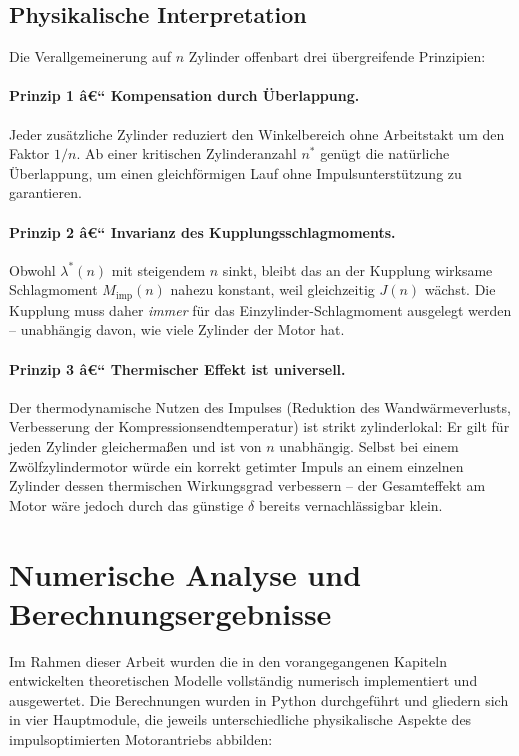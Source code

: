 ﻿\documentclass[a4paper,12pt]{article}
\begin{document}
\subsection{Physikalische Interpretation}

Die Verallgemeinerung auf $n$ Zylinder offenbart drei übergreifende Prinzipien:

\paragraph{Prinzip 1 â€“ Kompensation durch Überlappung.}
Jeder zusätzliche Zylinder reduziert den Winkelbereich ohne Arbeitstakt
um den Faktor $1/n$. Ab einer kritischen Zylinderanzahl $n^*$ genügt die
natürliche Überlappung, um einen gleichförmigen Lauf ohne Impulsunterstützung
zu garantieren.

\paragraph{Prinzip 2 â€“ Invarianz des Kupplungsschlagmoments.}
Obwohl $\lambda^*(n)$ mit steigendem $n$ sinkt, bleibt das an der
Kupplung wirksame Schlagmoment $M_\text{imp}(n)$ nahezu konstant, weil
gleichzeitig $J(n)$ wächst. Die Kupplung muss daher \textit{immer}
für das Einzylinder-Schlagmoment ausgelegt werden -- unabhängig davon,
wie viele Zylinder der Motor hat.

\paragraph{Prinzip 3 â€“ Thermischer Effekt ist universell.}
Der thermodynamische Nutzen des Impulses (Reduktion des Wandwärmeverlusts,
Verbesserung der Kompressionsendtemperatur) ist strikt zylinderlokal:
Er gilt für jeden Zylinder gleichermaßen und ist von $n$ unabhängig.
Selbst bei einem Zwölfzylindermotor würde ein korrekt getimter Impuls
an einem einzelnen Zylinder dessen thermischen Wirkungsgrad verbessern --
der Gesamteffekt am Motor wäre jedoch durch das günstige $\delta$ bereits
vernachlässigbar klein.

\section{Numerische Analyse und Berechnungsergebnisse}
\label{sec:analyse}

Im Rahmen dieser Arbeit wurden die in den vorangegangenen Kapiteln entwickelten
theoretischen Modelle vollständig numerisch implementiert und ausgewertet.
Die Berechnungen wurden in Python durchgeführt und gliedern sich in vier
Hauptmodule, die jeweils unterschiedliche physikalische Aspekte des
impulsoptimierten Motorantriebs abbilden:
\end{document}
